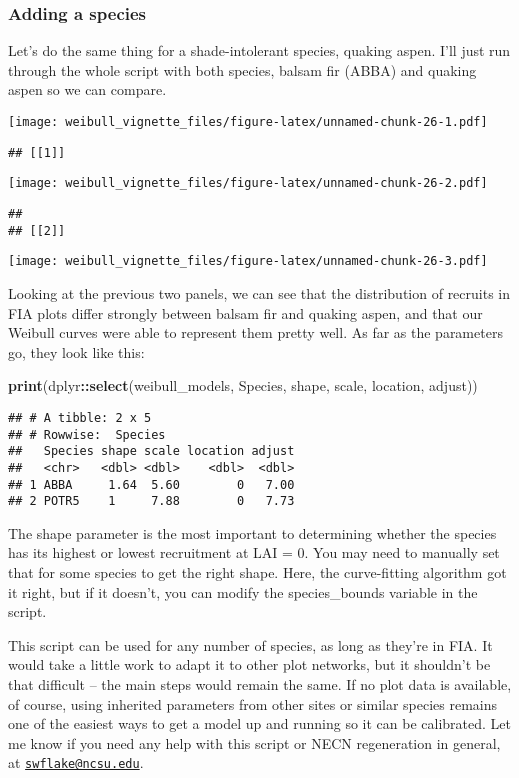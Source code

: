 \documentclass[
]{article}
\newenvironment{Shaded}{\begin{snugshade}}{\end{snugshade}}
\newcommand{\FunctionTok}[1]{\textcolor[rgb]{0.13,0.29,0.53}{\textbf{#1}}}
\newcommand{\NormalTok}[1]{#1}
\newcommand{\SpecialCharTok}[1]{\textcolor[rgb]{0.81,0.36,0.00}{\textbf{#1}}}
\begin{document}
\subsubsection{Adding a species}\label{adding-a-species}

Let's do the same thing for a shade-intolerant species, quaking aspen.
I'll just run through the whole script with both species, balsam fir
(ABBA) and quaking aspen so we can compare.

\texttt{[image: weibull\_vignette\_files/figure-latex/unnamed-chunk-26-1.pdf]}

\begin{verbatim}
## [[1]]
\end{verbatim}

\texttt{[image: weibull\_vignette\_files/figure-latex/unnamed-chunk-26-2.pdf]}

\begin{verbatim}
## 
## [[2]]
\end{verbatim}

\texttt{[image: weibull\_vignette\_files/figure-latex/unnamed-chunk-26-3.pdf]}

Looking at the previous two panels, we can see that the distribution of
recruits in FIA plots differ strongly between balsam fir and quaking
aspen, and that our Weibull curves were able to represent them pretty
well. As far as the parameters go, they look like this:

\begin{Shaded}
\begin{Highlighting}[]
\FunctionTok{print}\NormalTok{(dplyr}\SpecialCharTok{::}\FunctionTok{select}\NormalTok{(weibull\_models, Species, shape, scale, location, adjust))}
\end{Highlighting}
\end{Shaded}

\begin{verbatim}
## # A tibble: 2 x 5
## # Rowwise:  Species
##   Species shape scale location adjust
##   <chr>   <dbl> <dbl>    <dbl>  <dbl>
## 1 ABBA     1.64  5.60        0   7.00
## 2 POTR5    1     7.88        0   7.73
\end{verbatim}

The shape parameter is the most important to determining whether the
species has its highest or lowest recruitment at LAI = 0. You may need
to manually set that for some species to get the right shape. Here, the
curve-fitting algorithm got it right, but if it doesn't, you can modify
the species\_bounds variable in the script.

This script can be used for any number of species, as long as they're in
FIA. It would take a little work to adapt it to other plot networks, but
it shouldn't be that difficult -- the main steps would remain the same.
If no plot data is available, of course, using inherited parameters from
other sites or similar species remains one of the easiest ways to get a
model up and running so it can be calibrated. Let me know if you need
any help with this script or NECN regeneration in general, at
\href{mailto:swflake@ncsu.edu}{\nolinkurl{swflake@ncsu.edu}}.
\end{document}
